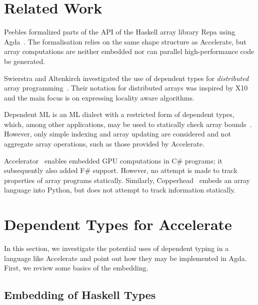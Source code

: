 \documentclass{llncs}
\begin{document}
\section{Related Work}
\label{sec:related-work}

Peebles formalized parts of the API of the Haskell array library Repa
using Agda~\cite{peebles:derpa}. The formalisation relies on the same
shape structure as Accelerate, but array computations are neither
embedded nor can parallel high-performance code be generated. 

Swierstra and Altenkirch investigated the use of dependent types for \emph{distributed} array programming~\cite{swierstra-altenkirch:dep-types-for-distr-arrays,swierstra:more-dependent-types}. Their notation for distributed arrays was inspired by X10 and the main focus is on expressing locality aware algorithms.

Dependent ML is an ML dialect with a restricted form of dependent types, which, among other applications, may be used to statically check array bounds~\cite{xi:dml-jfp}. However, only simple indexing and array updating are considered and not aggregate array operations, such as those provided by Accelerate.

Accelerator~\cite{Tarditi:2006} enables embedded GPU computations in C\# programs; it subsequently also added F\# support. However, no attempt is made to track properties of array programs statically. Similarly, Copperhead~\cite{Catanzaro:EECS-2010-124} embeds an array language into Python, but does not attempt to track information statically.

\section{Dependent Types for Accelerate}
\label{sec:dependent-types}

In this section, we investigate the potential uses of dependent typing
in a language like Accelerate and point out how they may be
implemented in Agda. First, we review some basics of the
embedding. 

\subsection{Embedding of Haskell Types}
\label{sec:embedding-types}
\end{document}
